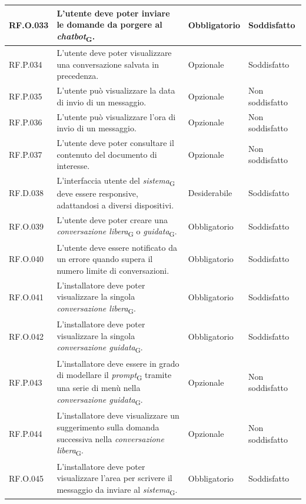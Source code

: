 \begin{table}[H]
\centering
    \begin{tabular}{|C{2.7cm}|L{6.5cm}|C{2.7cm}|C{2.7cm}|}
        \hline
        RF.O.033 & L’utente deve poter inviare le domande da porgere al \textit{chatbot}\textsubscript{G}.
         & Obbligatorio & Soddisfatto \\
        \hline
        RF.P.034 & L’utente deve poter visualizzare una conversazione salvata in precedenza.
         & Opzionale &  Soddisfatto \\
        \hline
        RF.P.035 & L’utente può visualizzare la data di invio di un messaggio.
         & Opzionale & Non soddisfatto \\
        \hline
        RF.P.036 & L’utente può visualizzare l'ora di invio di un messaggio.
         & Opzionale & Non soddisfatto \\
        \hline
        RF.P.037 & L’utente deve poter consultare il contenuto del documento di interesse.
         & Opzionale & Non soddisfatto \\
        \hline
        RF.D.038 & L'interfaccia utente del \textit{sistema}\textsubscript{G} deve essere responsive, adattandosi a diversi dispositivi. & Desiderabile &  Soddisfatto \\
        \hline
        RF.O.039 & L'utente deve poter creare una \textit{conversazione libera}\textsubscript{G} o \textit{guidata}\textsubscript{G}. & Obbligatorio & Soddisfatto \\ \hline
        RF.O.040 & L'utente deve essere notificato da un errore quando supera il numero limite di conversazioni. & Obbligatorio & Soddisfatto \\ \hline
        RF.O.041 & L'installatore deve poter visualizzare la singola \textit{conversazione libera}\textsubscript{G}. & Obbligatorio & Soddisfatto \\ \hline 
        RF.O.042 & L'installatore deve poter visualizzare la singola \textit{conversazione guidata}\textsubscript{G}. & Obbligatorio & Soddisfatto \\ \hline
        RF.P.043 & L'installatore deve essere in grado di modellare il \textit{prompt}\textsubscript{G} tramite una serie di menù nella \textit{conversazione guidata}\textsubscript{G}. & Opzionale & Non soddisfatto \\
        \hline
        RF.P.044 & L'installatore deve visualizzare un suggerimento sulla domanda successiva nella \textit{conversazione libera}\textsubscript{G}. & Opzionale & Non soddisfatto \\ \hline
        RF.O.045 & L'installatore deve poter visualizzare l'area per scrivere il messaggio da inviare al \textit{sistema}\textsubscript{G}. & Obbligatorio & Soddisfatto \\ \hline
        

\end{tabular}
\end{table}
